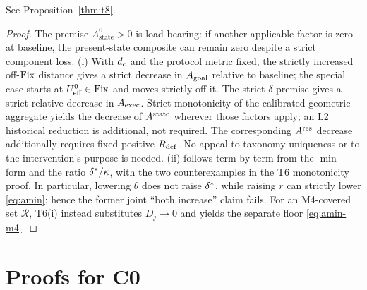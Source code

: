 \begin{proposition}
See Proposition~\ref{thm:t8}.
\end{proposition}
\begin{proof}
The premise $A_{\mathrm{state}}^0>0$ is load-bearing: if another applicable
factor is zero at baseline, the present-state composite can remain zero despite
a strict component loss.
(i) With $d_{c}$ and the protocol metric fixed, the strictly increased
off-$\mathrm{Fix}$ distance gives a strict decrease in $A_{\mathrm{goal}}$ relative to
baseline; the special case starts at $U_{\mathrm{eff}}^0\in\mathrm{Fix}$ and moves strictly off
it. The strict $\delta$ premise gives a strict relative decrease in
$A_{\mathrm{exec}}$. Strict monotonicity of the calibrated geometric aggregate yields the decrease
of $A^{\mathrm{state}}$ wherever those factors apply; an L2 historical reduction is
additional, not required. The corresponding $A^{\mathrm{res}}$ decrease additionally
requires fixed positive $R_{\mathrm{def}}$. No appeal to taxonomy uniqueness or to the
intervention's purpose is needed. (ii) follows term by term from the
$\min$-form and the ratio $\delta^{*}/\kappa$, with the two counterexamples
in the T6 monotonicity proof. In particular, lowering $\theta$ does not
raise $\delta^{*}$, while raising $r$ can strictly lower
\eqref{eq:amin}; hence the former joint ``both increase'' claim fails. For
an M4-covered set
$\mathcal R$, T6(i) instead substitutes $D_j\to0$ and yields the separate
floor \eqref{eq:amin-m4}.
\end{proof}

\section{Proofs for C0}\label{app:c0}

